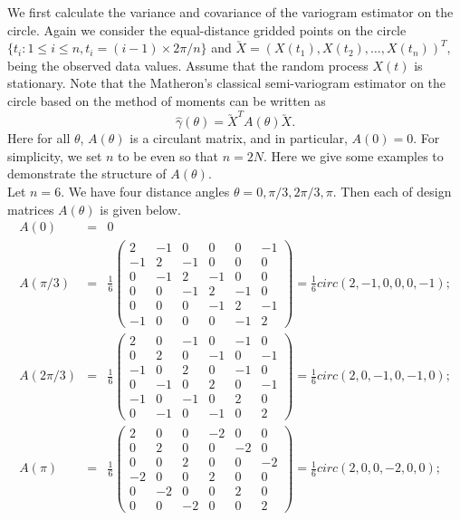 We first calculate the variance and covariance of the variogram estimator on the circle. Again we consider the equal-distance gridded points on the circle $\{t_i: 1 \le i \le n, t_i = (i-1) \times 2\pi/n\}$ and $\utilde{X} = (X(t_1), X(t_2), \ldots, X(t_n))^T,$ being the observed data values. Assume that the random process $X(t)$ is stationary. Note that the Matheron's classical semi-variogram estimator on the circle based on the method of moments can be written as
\[
\hat{\gamma}(\theta) = \utilde{X}^T A(\theta)\utilde{X}.
\]
Here for all $\theta$, $A(\theta)$ is a circulant matrix, and in particular, $A(0)= 0$. For simplicity, we set $n$ to be even so that $n = 2N$. Here we give some examples to demonstrate the structure of $A(\theta)$. \\

Let $n = 6$. We have four distance angles $\theta = 0, \pi/3, 2\pi/3, \pi$. Then each of design matrices $A(\theta)$ is given below.
\begin{eqnarray*}
A(0) &=& 0  \\
A(\pi/3) &=& \frac{1}{6} \left(\begin{array}{cccccc}
2  &  -1 & 0  & 0 & 0 & -1 \\
-1 &  2  & -1 & 0 & 0 & 0   \\
0  & -1  & 2  & -1 & 0  & 0 \\
0  & 0   & -1 & 2  & -1 & 0 \\
0  & 0   &  0 & -1 & 2  & -1 \\
-1 & 0   &  0 &  0 & -1 & 2
\end{array}
\right) = \frac{1}{6} circ(2, -1, 0, 0, 0, -1); \\
A(2\pi/3) &=& \frac{1}{6} \left(\begin{array}{cccccc}
2  &  0  & -1  & 0 & -1 & 0 \\
0  &  2  & 0   & -1 & 0 & -1   \\
-1  & 0  & 2   & 0 & -1  & 0 \\
0  & -1   & 0  & 2  & 0 & -1 \\
-1  & 0   &  -1  & 0 & 2  & 0 \\
0 & -1   &  0  &  -1 & 0 & 2
\end{array}
\right) = \frac{1}{6} circ(2, 0, -1, 0, -1, 0); \\
A(\pi) &=& \frac{1}{6} \left(\begin{array}{cccccc}
2  &  0 & 0  & -2 & 0 & 0 \\
0 &  2  & 0 & 0 & -2 & 0   \\
0  & 0  & 2  & 0 & 0  & -2 \\
-2  & 0   & 0 & 2  & 0 & 0 \\
0  & -2   &  0 & 0 & 2  & 0 \\
0 & 0   &  -2 &  0 & 0 & 2
\end{array}
\right) = \frac{1}{6} circ(2, 0, 0, -2, 0, 0); \\
\end{eqnarray*}

